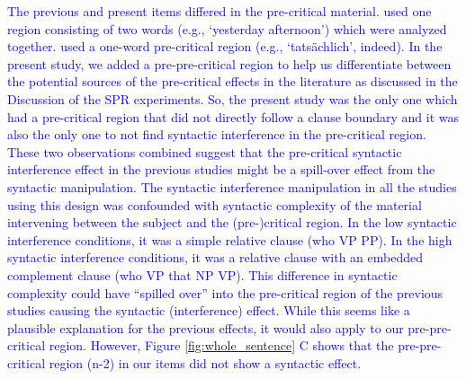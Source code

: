 \documentclass[a4paper, man, floatsintext]{apa7}
\begin{document}
{\textcolor{blue}{The previous and present items differed in the pre-critical material. \citet{vandyke07} used one region consisting of two words (e.g., `yesterday afternoon') which were analyzed together. \textcite{mertzen} used a one-word pre-critical region (e.g., `tatsächlich', indeed). In the present study, we added a pre-pre-critical region to help us differentiate between the potential sources of the pre-critical effects in the literature as discussed in the Discussion of the SPR experiments. So, the present study was the only one which had a pre-critical region that did not directly follow a clause boundary and it was also the only one to not find syntactic interference in the pre-critical region. These two observations combined suggest that the pre-critical syntactic interference effect in the previous studies might be a spill-over effect from the syntactic manipulation. The syntactic interference manipulation in all the studies using this design was confounded with syntactic complexity of the material intervening between the subject and the (pre-)critical region. In the low syntactic interference conditions, it was a simple relative clause (who VP PP). In the high syntactic interference conditions, it was a relative clause with an embedded complement clause (who VP that NP VP). This difference in syntactic complexity could have ``spilled over'' into the pre-critical region of the previous studies causing the syntactic (interference) effect. While this seems like a plausible explanation for the previous effects, it would also apply to our pre-pre-critical region. However, Figure \ref{fig:whole_sentence} C shows that the pre-pre-critical region (n-2) in our items did not show a syntactic effect.}

\label{comma}

}
\end{document}
